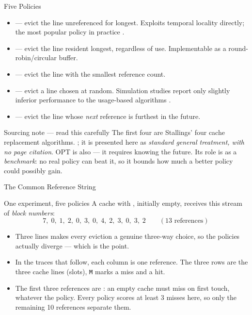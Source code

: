 \documentclass[aspectratio=169]{beamer}
\begin{document}
\begin{frame}{Five Policies}
  \footnotesize
  \begin{itemize}
    \item {} --- evict the line unreferenced for
      longest. Exploits temporal locality directly; the most popular policy in
      practice
      \cite[\S5.2, PDF p.~203]{Stallings2015_computer_organization}.
    \item {} --- evict the line resident
      longest, regardless of use. Implementable as a round-robin/circular
      buffer.
    \item {} --- evict the line with the
      smallest reference count.
    \item {} --- evict a line chosen at random. Simulation studies
      report only slightly inferior performance to the usage-based algorithms
      \cite[\S5.2, PDF p.~203]{Stallings2015_computer_organization}.
    \item {} --- evict the line whose
      \emph{next} reference is furthest in the future.
  \end{itemize}
  \vspace{0.15cm}
  \begin{alertblock}{Sourcing note --- read this carefully}
    The first four are Stallings' four cache replacement algorithms. ; it is presented here as \emph{standard
    general treatment, with no page citation}. OPT is also 
    --- it requires knowing the future. Its role is as a \emph{benchmark}: no
    real policy can beat it, so it bounds how much a better policy could
    possibly gain.
  \end{alertblock}
\end{frame}

\begin{frame}{The Common Reference String}
  \begin{exampleblock}{One experiment, five policies}
    A  cache with , initially empty,
    receives this stream of \emph{block numbers}:
    \[
      7,\;0,\;1,\;2,\;0,\;3,\;0,\;4,\;2,\;3,\;0,\;3,\;2
      \qquad (13 \text{ references})
    \]
  \end{exampleblock}
  \begin{itemize}
    \item Three lines makes every eviction a genuine three-way choice, so the
      policies actually diverge --- which is the point.
    \item In the traces that follow, each column is one reference. The three
      rows are the three cache lines (slots), \texttt{M} marks a miss and
       a hit.
    \item The first three references are : an empty
      cache must miss on first touch, whatever the policy. Every policy scores
      at least 3 misses here, so only the remaining 10 references separate
      them.
  \end{itemize}
\end{frame}
\end{document}
